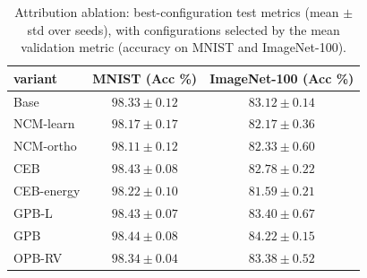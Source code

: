 \begin{table}[t]
\centering
\small
\caption{Attribution ablation: best-configuration test metrics (mean $\pm$ std
over seeds), with configurations selected by the mean validation metric
(accuracy on MNIST and ImageNet-100).}
\label{tab:ablation}
\begin{tabular}{l c c}
\hline
variant & MNIST (Acc \%) & ImageNet-100 (Acc \%) \\
\hline
Base & $98.33 \pm 0.12$ & $83.12 \pm 0.14$ \\
NCM-learn & $98.17 \pm 0.17$ & $82.17 \pm 0.36$ \\
NCM-ortho & $98.11 \pm 0.12$ & $82.33 \pm 0.60$ \\
CEB & $98.43 \pm 0.08$ & $82.78 \pm 0.22$ \\
CEB-energy & $98.22 \pm 0.10$ & $81.59 \pm 0.21$ \\
GPB-L & $98.43 \pm 0.07$ & $83.40 \pm 0.67$ \\
GPB & $98.44 \pm 0.08$ & $84.22 \pm 0.15$ \\
OPB-RV & $98.34 \pm 0.04$ & $83.38 \pm 0.52$ \\
\hline
\end{tabular}
\end{table}
